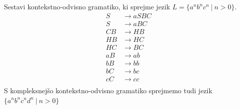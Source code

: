 \documentclass[10pt,a4paper,oneside]{book}
\begin{document}
\begin{primeri}
\item Sestavi kontekstno-odvisno gramatiko, ki sprejme jezik $L=\{ a^n b^n c^n\ |\ n>0 \}$.
	\begin{align*}
	S &\rightarrow aSBC\\
	S &\rightarrow aBC \\
	CB &\rightarrow HB \\
	HB &\rightarrow HC \\
	HC &\rightarrow BC \\
	aB &\rightarrow ab \\
	bB &\rightarrow bb \\
	bC &\rightarrow bc \\
	cC &\rightarrow cc \\
	\end{align*}
	S kompleksnejšo kontekstno-odvisno gramatiko sprejmemo tudi jezik $\{ a^n b^n c^n d^n\ |\ n>0 \}$
\end{primeri}

\end{document}
